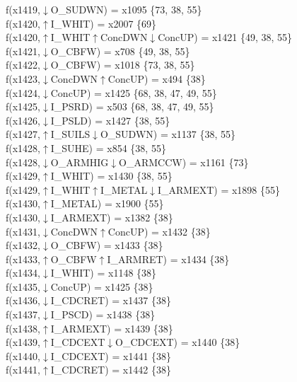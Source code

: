 f(x1419,$\downarrow$O\_SUDWN) = x1095 \{73, 38, 55\} \\  
f(x1420,$\uparrow$I\_WHIT) = x2007 \{69\} \\  
f(x1420,$\uparrow$I\_WHIT$\uparrow$ConcDWN$\downarrow$ConcUP) = x1421 \{49, 38, 55\} \\  
f(x1421,$\downarrow$O\_CBFW) = x708 \{49, 38, 55\} \\  
f(x1422,$\downarrow$O\_CBFW) = x1018 \{73, 38, 55\} \\  
f(x1423,$\downarrow$ConcDWN$\uparrow$ConcUP) = x494 \{38\} \\  
f(x1424,$\downarrow$ConcUP) = x1425 \{68, 38, 47, 49, 55\} \\  
f(x1425,$\downarrow$I\_PSRD) = x503 \{68, 38, 47, 49, 55\} \\  
f(x1426,$\downarrow$I\_PSLD) = x1427 \{38, 55\} \\  
f(x1427,$\uparrow$I\_SUILS$\downarrow$O\_SUDWN) = x1137 \{38, 55\} \\  
f(x1428,$\uparrow$I\_SUHE) = x854 \{38, 55\} \\  
f(x1428,$\downarrow$O\_ARMHIG$\downarrow$O\_ARMCCW) = x1161 \{73\} \\  
f(x1429,$\uparrow$I\_WHIT) = x1430 \{38, 55\} \\  
f(x1429,$\uparrow$I\_WHIT$\uparrow$I\_METAL$\downarrow$I\_ARMEXT) = x1898 \{55\} \\  
f(x1430,$\uparrow$I\_METAL) = x1900 \{55\} \\  
f(x1430,$\downarrow$I\_ARMEXT) = x1382 \{38\} \\  
f(x1431,$\downarrow$ConcDWN$\uparrow$ConcUP) = x1432 \{38\} \\  
f(x1432,$\downarrow$O\_CBFW) = x1433 \{38\} \\  
f(x1433,$\uparrow$O\_CBFW$\uparrow$I\_ARMRET) = x1434 \{38\} \\  
f(x1434,$\downarrow$I\_WHIT) = x1148 \{38\} \\  
f(x1435,$\downarrow$ConcUP) = x1425 \{38\} \\  
f(x1436,$\downarrow$I\_CDCRET) = x1437 \{38\} \\  
f(x1437,$\downarrow$I\_PSCD) = x1438 \{38\} \\  
f(x1438,$\uparrow$I\_ARMEXT) = x1439 \{38\} \\  
f(x1439,$\uparrow$I\_CDCEXT$\downarrow$O\_CDCEXT) = x1440 \{38\} \\  
f(x1440,$\downarrow$I\_CDCEXT) = x1441 \{38\} \\  
f(x1441,$\uparrow$I\_CDCRET) = x1442 \{38\} \\  
